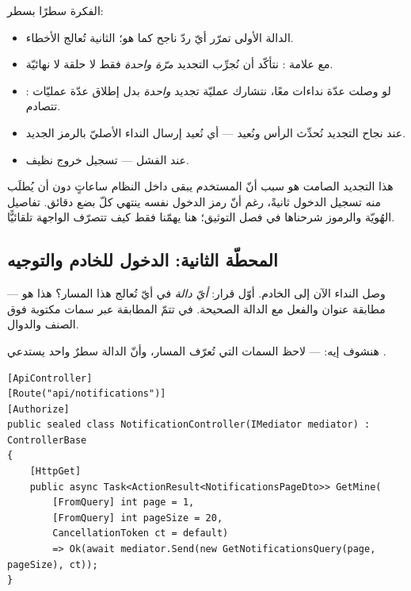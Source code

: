الفكرة سطرًا بسطر:
\begin{itemize}
\item الدالة الأولى تمرّر أيّ ردّ ناجح كما هو؛ الثانية تُعالج الأخطاء.
\item {} مع علامة : نتأكّد أن نُجرِّب التجديد
  \emph{مرّة واحدة} فقط لا حلقة لا نهائيّة.
\item {}: لو وصلت عدّة نداءات  معًا، نتشارك عمليّة
  تجديد \emph{واحدة} بدل إطلاق عدّة عمليّات تتصادم.
\item عند نجاح التجديد نُحدِّث الرأس ونُعيد  — أي نُعيد
  إرسال النداء الأصليّ بالرمز الجديد.
\item عند الفشل  — تسجيل خروج نظيف.
\end{itemize}

\begin{note}
هذا التجديد الصامت هو سبب أنّ المستخدم يبقى داخل النظام ساعاتٍ دون أن يُطلَب منه
تسجيل الدخول ثانيةً، رغم أنّ رمز الدخول نفسه ينتهي كلّ بضع دقائق. تفاصيل الهُويّة
والرموز شرحناها في فصل التوثيق؛ هنا يهمّنا فقط كيف تتصرّف الواجهة تلقائيًّا.
\end{note}

\subsection{المحطّة الثانية: الدخول للخادم والتوجيه }

وصل النداء الآن إلى الخادم. أوّل قرار: \emph{أيّ دالة} في أيّ  تُعالج
هذا المسار؟ هذا هو  — مطابقة عنوان  والفعل 
مع الدالة الصحيحة. في  تتمّ المطابقة عبر سمات 
مكتوبة فوق الصنف والدوال.

هنشوف إيه:  — لاحظ السمات التي تُعرّف المسار، وأنّ الدالة
سطرٌ واحد يستدعي .

\begin{english}
\begin{lstlisting}[language={[Sharp]C}]
[ApiController]
[Route("api/notifications")]
[Authorize]
public sealed class NotificationController(IMediator mediator) : ControllerBase
{
    [HttpGet]
    public async Task<ActionResult<NotificationsPageDto>> GetMine(
        [FromQuery] int page = 1,
        [FromQuery] int pageSize = 20,
        CancellationToken ct = default)
        => Ok(await mediator.Send(new GetNotificationsQuery(page, pageSize), ct));
}
\end{lstlisting}
\end{english}

